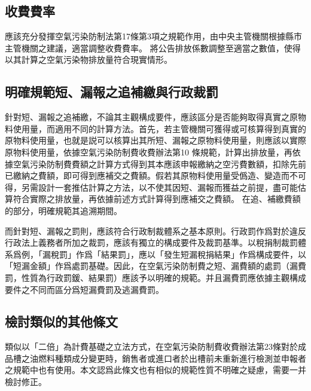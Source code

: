 \documentclass[14pt,a4paper]{article}
\begin{document}
\subsection{收費費率}
應該充分發揮空氣污染防制法第17條第3項之規範作用，由中央主管機關根據縣市主管機關之建議，適當調整收費費率。
將公告排放係數調整至適當之數值，使得以其計算之空氣污染物排放量符合現實情形。

\subsection{明確規範短、漏報之追補繳與行政裁罰}
針對短、漏報之追補繳，不論其主觀構成要件，應該區分是否能夠取得真實之原物料使用量，而適用不同的計算方法。首先，若主管機關可獲得或可核算得到真實的原物料使用量，也就是説可以核算出其所短、漏報之原物料使用量，則應該以實際原物料使用量，依據空氣污染防制費收費辦法第10 條規範，計算出排放量，再依據空氣污染防制費費額之計算方式得到其本應該申報繳納之空污費數額，扣除先前已繳納之費額，即可得到應補交之費額。假若其原物料使用量受僞造、變造而不可得，另需設計一套推估計算之方法，以不使其因短、漏報而獲益之前提，盡可能估算符合實際之排放量，再依據前述方式計算得到應補交之費額。
在追、補繳費額的部分，明確規範其追溯期間。


而針對短、漏報之罰則，應該符合行政制裁體系之基本原則。行政罰作爲對於違反行政法上義務者所加之裁罰，應該有獨立的構成要件及裁罰基準。以稅捐制裁罰體系爲例，「漏稅罰」作爲「結果罰」，應以「發生短漏稅捐結果」作爲構成要件，以「短漏金額」作爲處罰基礎。因此，在空氣污染防制費之短、漏費額的處罰（漏費罰，性質為行政罰鍰、結果罰）應該予以明確的規範。并且漏費罰應依據主觀構成要件之不同而區分爲短漏費罰及逃漏費罰。

\subsection{檢討類似的其他條文}
類似以「二倍」為計費基礎之立法方式，在空氣污染防制費收費辦法第23條對於成品槽之油燃料種類成分變更時，銷售者或進口者於出槽前未重新進行檢測並申報者之規範中也有使用。本文認爲此條文也有相似的規範性質不明確之疑慮，需要一并檢討修正。
\end{document}
